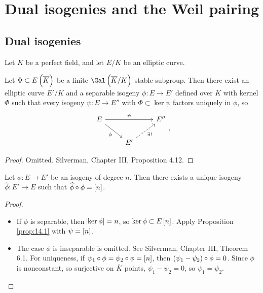 \pagebreak

\section{Dual isogenies and the Weil pairing}

\subsection{Dual isogenies}

Let $ K $ be a perfect field, and let $ E / K $ be an elliptic curve.

\begin{proposition}
\label{prop:14.1}
Let $ \Phi \subset E\br{\overline{K}} $ be a finite $ \Gal\br{\overline{K} / K} $-stable subgroup. Then there exist an elliptic curve $ E' / K $ and a separable isogeny $ \phi : E \to E' $ defined over $ K $ with kernel $ \Phi $ such that every isogeny $ \psi : E \to E'' $ with $ \Phi \subset \ker \psi $ factors uniquely in $ \phi $, so
$$
\begin{tikzcd}
E \arrow{rr}{\psi} \arrow{dr}[swap]{\phi} & & E'' \\
& E' \arrow[dashed]{ur}[swap]{\exists !} &
\end{tikzcd}.
$$
\end{proposition}

\begin{proof}
Omitted. Silverman, Chapter III, Proposition 4.12.
\end{proof}

\begin{proposition}
Let $ \phi : E \to E' $ be an isogeny of degree $ n $. Then there exists a unique isogeny $ \widehat{\phi} : E' \to E $ such that $ \widehat{\phi} \circ \phi = \sbr{n} $.
\end{proposition}

\begin{proof}
\hfill
\begin{itemize}
\item If $ \phi $ is separable, then $ \abs{\ker \phi} = n $, so $ \ker \phi \subset E\sbr{n} $. Apply Proposition \ref{prop:14.1} with $ \psi = \sbr{n} $.
\item The case $ \phi $ is inseparable is omitted. See Silverman, Chapter III, Theorem 6.1. For uniqueness, if $ \psi_1 \circ \phi = \psi_2 \circ \phi = \sbr{n} $, then $ \br{\psi_1 - \psi_2} \circ \phi = 0 $. Since $ \phi $ is nonconstant, so surjective on $ \overline{K} $ points, $ \psi_1 - \psi_2 = 0 $, so $ \psi_1 = \psi_2 $.
\end{itemize}
\end{proof}

